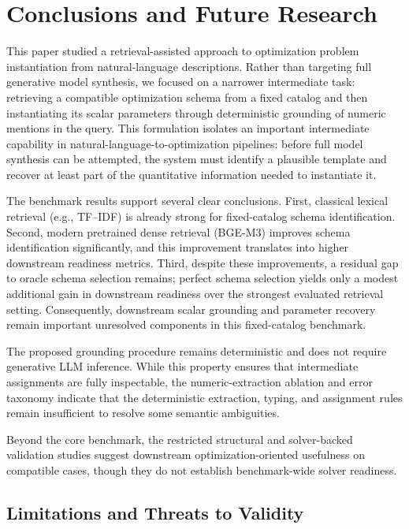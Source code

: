 \documentclass[3p]{elsarticle}
\begin{document}
\section{Conclusions and Future Research}
\label{sec:conclusion}

This paper studied a retrieval-assisted approach to optimization problem instantiation from natural-language descriptions. Rather than targeting full generative model synthesis, we focused on a narrower intermediate task: retrieving a compatible optimization schema from a fixed catalog and then instantiating its scalar parameters through deterministic grounding of numeric mentions in the query. This formulation isolates an important intermediate capability in natural-language-to-optimization pipelines: before full model synthesis can be attempted, the system must identify a plausible template and recover at least part of the quantitative information needed to instantiate it.

The benchmark results support several clear conclusions. First, classical lexical retrieval (e.g., TF--IDF) is already strong for fixed-catalog schema identification. Second, modern pretrained dense retrieval (BGE-M3) improves schema identification significantly, and this improvement translates into higher downstream readiness metrics. Third, despite these improvements, a residual gap to oracle schema selection remains; perfect schema selection yields only a modest additional gain in downstream readiness over the strongest evaluated retrieval setting. Consequently, downstream scalar grounding and parameter recovery remain important unresolved components in this fixed-catalog benchmark.

The proposed grounding procedure remains deterministic and does not require generative LLM inference. While this property ensures that intermediate assignments are fully inspectable, the numeric-extraction ablation and error taxonomy indicate that the deterministic extraction, typing, and assignment rules remain insufficient to resolve some semantic ambiguities. 

Beyond the core benchmark, the restricted structural and solver-backed validation studies suggest downstream optimization-oriented usefulness on compatible cases, though they do not establish benchmark-wide solver readiness.

\subsection{Limitations and Threats to Validity}
\label{subsec:limitations}
\end{document}
